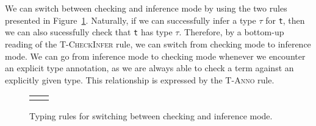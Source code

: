 We can switch between checking and inference mode by using the two rules presented in Figure~\ref{fig:bidirectional-modes}. Naturally, if we can successfully infer a type $\tau$ for \texttt{t}, then we can also sucessfully check that \texttt{t} has type $\tau$. Therefore, by a bottom-up reading of the \textsc{T-CheckInfer} rule, we can switch from checking mode to inference mode. We can go from inference mode to checking mode whenever we encounter an explicit type annotation, as we are always able to check a term against an explicitly given type. This relationship is expressed by the \textsc{T-Anno} rule.

\newsavebox{\ptCheckInfer}
\begin{lrbox}{\ptCheckInfer}
\begin{varwidth}{\linewidth}
\begin{prooftree}
\end{prooftree}
\end{varwidth}
\end{lrbox}

\newsavebox{\ptAnno}
\begin{lrbox}{\ptAnno}
\begin{varwidth}{\linewidth}
\begin{prooftree}
\end{prooftree}
\end{varwidth}
\end{lrbox}

\begin{figure}
\begin{center}
\begin{tabu}{c c}
\usebox{\ptCheckInfer} & \usebox{\ptAnno}
\end{tabu}
\end{center}
\caption{Typing rules for switching between checking and inference mode.}
\label{fig:bidirectional-modes}
\end{figure}


